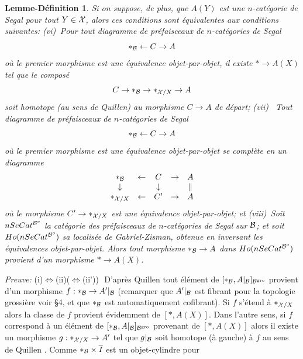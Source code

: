 \documentclass[12pt]{article}
\newtheorem{lemmedefinition}[lemma]{Lemme-D\'efinition}
\newcommand{\Bb}{{\cal B}}
\newcommand{\Xx}{{\cal X}}
\begin{document}
\begin{lemmedefinition}
Si on suppose, de plus, que $A(Y)$ est une $n$-cat\'egorie de Segal pour tout
$Y\in \Xx$, alors ces conditions sont \'equivalentes aux conditions suivantes:
\newline
(vi)\, Pour tout diagramme de pr\'efaisceaux de $n$-cat\'egories de Segal
$$
\ast _{\Bb } \leftarrow C \rightarrow A
$$
o\`u le premier morphisme est une \'equivalence objet-par-objet, il existe $\ast
\rightarrow A(X)$ tel que le compos\'e
$$
C\rightarrow \ast _{\Bb} \rightarrow \ast _{\Xx /X} \rightarrow A
$$
soit homotope (au sens de Quillen) au morphisme $C\rightarrow A$ de d\'epart;
\newline
(vii) \, Tout diagramme de pr\'efaisceaux de $n$-cat\'egories de Segal
$$
\ast _{\Bb } \leftarrow C \rightarrow A
$$
o\`u le premier morphisme est une \'equivalence objet-par-objet se
compl\`ete en un
diagramme
$$
\begin{array}{ccccc}
\ast _{\Bb }& \leftarrow &C &\rightarrow &A\\
\downarrow &&\downarrow && \parallel \\
\ast _{\Xx /X }& \leftarrow &C' &\rightarrow &A
\end{array}
$$
o\`u le morphisme $C'\rightarrow \ast _{\Xx /X}$ est une \'equivalence
objet-par-objet; et
\newline
(viii)\, Soit $nSeCat^{\Bb^o}$ la cat\'egorie des pr\'efaisceaux de
$n$-cat\'egories de Segal sur $\Bb$; et soit $Ho( nSeCat^{\Bb^o})$
sa localis\'ee de Gabriel-Zisman, obtenue en inversant les \'equivalences
objet-par-objet. Alors tout morphisme
$\ast _{\Bb}\rightarrow A$ dans $Ho( nSeCat^{\Bb^o})$
provient d'un morphisme $\ast \rightarrow A(X)$.
\end{lemmedefinition}
{\em Preuve:}
\newline
(i)$\Leftrightarrow$(ii)($\Leftrightarrow$(ii'))\,\,
D'apr\`es Quillen \cite{Quillen} tout
\'el\'ement de
$[\ast _{\Bb}, A|_{\Bb}]_{\Bb ^{\rm gro}}$ provient d'un morphisme
$f:\ast _{\Bb}\rightarrow A'|_{\Bb }$ (remarquer que $A'|_{\Bb }$ est
fibrant pour
la topologie grossi\`ere voir \S 4, et que $\ast_{\Bb}$ est automatiquement
cofibrant). Si $f$ s'\'etend \`a $\ast _{\Xx /X}$ alors la classe de $f$
provient \'evidemment de $[\ast , A(X)]$. Dans l'autre sens, si $f$ correspond
\`a un \'el\'ement de $[\ast _{\Bb}, A|_{\Bb}]_{\Bb ^{\rm gro}}$ provenant de
$[\ast , A(X)]$ alors il existe un morphisme $g:\ast _{\Xx /X}\rightarrow
A'$ tel
que $g|_{\Bb}$ soit homotope (\`a gauche) \`a $f$ au sens de Quillen
\cite{Quillen}. Comme $\ast _{\Bb} \times \overline{I}$ est un
objet-cylindre pour
\end{document}
